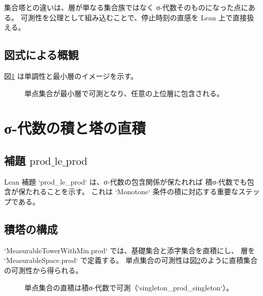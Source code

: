 \documentclass[a4paper,11pt]{ltjsarticle}
\begin{document}
集合塔との違いは、層が単なる集合族ではなく σ-代数そのものになった点にある。
可測性を公理として組み込むことで、停止時刻の直感を Lean 上で直接扱える。

\subsection{図式による概観}

図\ref{fig:tower} は単調性と最小層のイメージを示す。

\begin{figure}[htbp]
  \centering
  \caption{単点集合が最小層で可測となり、任意の上位層に包含される。}
  \label{fig:tower}
\end{figure}

\section{σ-代数の積と塔の直積}

\subsection{補題 \texorpdfstring{$\mathrm{prod\_le\_prod}$}{prod\_le\_prod}}

Lean 補題 `prod_le_prod` は、σ-代数の包含関係が保たれれば
積σ-代数でも包含が保たれることを示す。
これは `Monotone` 条件の積に対応する重要なステップである。

\subsection{積塔の構成}

`MeasurableTowerWithMin.prod` では、基礎集合と添字集合を直積にし、
層を `MeasurableSpace.prod` で定義する。
単点集合の可測性は図\ref{fig:prod}のように直積集合の可測性から得られる。

\begin{figure}[htbp]
  \centering
  \caption{単点集合の直積は積σ-代数で可測（`singleton\_prod\_singleton`）。}
  \label{fig:prod}
\end{figure}
\end{document}
